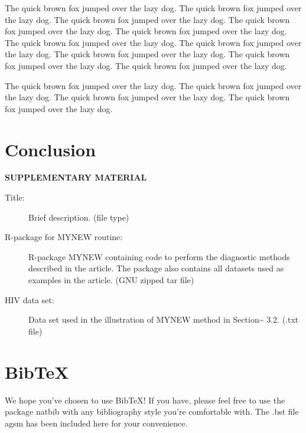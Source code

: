 \documentclass[
  12pt]{article}
\begin{document}
The quick brown fox jumped over the lazy dog. The quick brown fox jumped
over the lazy dog. The quick brown fox jumped over the lazy dog. The
quick brown fox jumped over the lazy dog. The quick brown fox jumped
over the lazy dog. The quick brown fox jumped over the lazy dog. The
quick brown fox jumped over the lazy dog. The quick brown fox jumped
over the lazy dog. The quick brown fox jumped over the lazy dog. The
quick brown fox jumped over the lazy dog.

The quick brown fox jumped over the lazy dog. The quick brown fox jumped
over the lazy dog. The quick brown fox jumped over the lazy dog. The
quick brown fox jumped over the lazy dog.

\addtolength{\textheight}{-.2in}%

\hypertarget{sec-conc}{%
\section{Conclusion}\label{sec-conc}}

\hypertarget{supplementary-material}{}
\bigskip

\begin{center}

{\large\bf SUPPLEMENTARY MATERIAL}

\end{center}

\begin{description}
\item[Title:]
Brief description. (file type)
\item[R-package for MYNEW routine:]
R-package MYNEW containing code to perform the diagnostic methods
described in the article. The package also contains all datasets used as
examples in the article. (GNU zipped tar file)
\item[HIV data set:]
Data set used in the illustration of MYNEW method in
Section\textasciitilde{} 3.2. (.txt file)
\end{description}

\hypertarget{bibtex}{%
\section{BibTeX}\label{bibtex}}

We hope you've chosen to use BibTeX! If you have, please feel free to
use the package natbib with any bibliography style you're comfortable
with. The .bst file agsm has been included here for your convenience.


  
\end{document}
